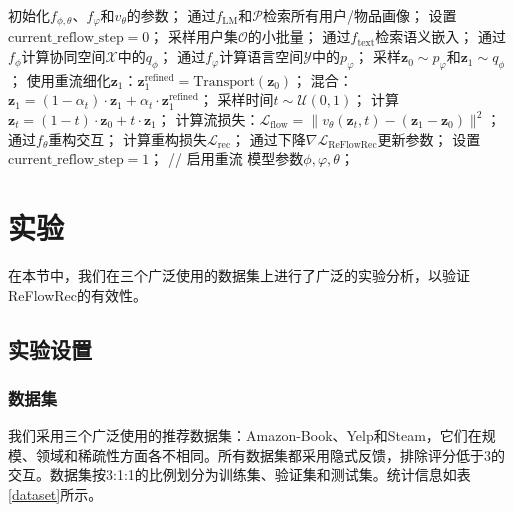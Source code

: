 \documentclass[sigconf]{acmart}
\begin{document}
\begin{algorithm}
\caption{\textsf{ReFlowRec}的训练过程}
\label{algorithm_reflowrec}
\begin{algorithmic}[1]
\STATE 初始化$f_{\phi, \theta}$、$f_\varphi$和$v_\theta$的参数；
\STATE 通过$f_{\text{LM}}$和$\mathcal P$检索所有用户/物品画像；
\STATE 设置$\text{current\_reflow\_step} = 0$；
\STATE 采样用户集$\mathcal O$的小批量；
\STATE 通过$f_{\text{text}}$检索语义嵌入；
\STATE 通过$f_{\phi}$计算协同空间$\mathcal X$中的$q_{\phi}$；
\STATE 通过$f_\varphi$计算语言空间$\mathcal Y$中的$p_{\varphi}$；
\STATE 采样$\mathbf z_0 \sim p_{\varphi}$和$\mathbf z_1 \sim q_{\phi}$；
\STATE 使用重流细化$\mathbf z_1$：$\mathbf z_1^{\text{refined}} = \text{Transport}(\mathbf z_0)$；
\STATE 混合：$\mathbf z_1 = (1-\alpha_t) \cdot \mathbf z_1 + \alpha_t \cdot \mathbf z_1^{\text{refined}}$；
\ENDIF
\STATE 采样时间$t \sim \mathcal U(0,1)$；
\STATE 计算$\mathbf z_t = (1-t) \cdot \mathbf z_0 + t \cdot \mathbf z_1$；
\STATE 计算流损失：$\mathcal L_{\text{flow}} = \|v_\theta(\mathbf z_t, t) - (\mathbf z_1 - \mathbf z_0)\|^2$；
\STATE 通过$f_{\theta}$重构交互；
\STATE 计算重构损失$\mathcal L_{\text{rec}}$；
\ENDFOR
\STATE 通过下降$\nabla \mathcal L_{\text{ReFlowRec}}$更新参数；
\STATE 设置$\text{current\_reflow\_step} = 1$； // 启用重流
\ENDIF
\ENDWHILE
\RETURN 模型参数$\phi, \varphi, \theta$；
\end{algorithmic}
\end{algorithm}

\section{实验}
在本节中，我们在三个广泛使用的数据集上进行了广泛的实验分析，以验证\textsf{ReFlowRec}的有效性。

\subsection{实验设置}
\subsubsection{\textbf{数据集}} 
我们采用三个广泛使用的推荐数据集：Amazon-Book、Yelp和Steam\cite{ren2024representation}，它们在规模、领域和稀疏性方面各不相同。所有数据集都采用隐式反馈，排除评分低于3的交互。数据集按3:1:1的比例划分为训练集、验证集和测试集。统计信息如表\ref{dataset}所示。
\end{document}
